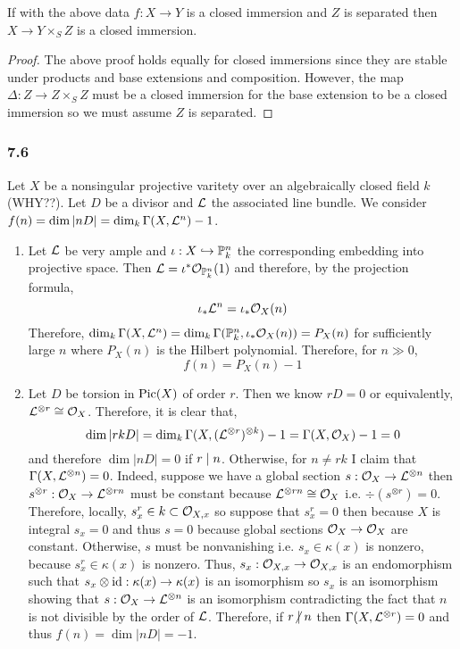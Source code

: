 \documentclass[12pt]{article}
\begin{document}
\begin{corollary}
If with the above data $f : X \to Y$ is a closed immersion and $Z$ is separated then $X \to Y \times_S Z$ is a closed immersion.
\end{corollary}

\begin{proof}
The above proof holds equally for closed immersions since they are stable under products and base extensions and composition. However, the map $\Delta : Z \to Z \times_S Z$ must be a closed immersion for the base extension to be a closed immersion so we must assume $Z$ is separated. 
\end{proof}

\subsubsection{7.6}

Let $X$ be a nonsingular projective varitety over an algebraically closed field $k$ (WHY??). Let $D$ be a divisor and $\mathcal{L}$ the associated line bundle. We consider $f(n) = \dim |n D| = \dim_k \Gamma(X, \mathcal{L}^n) - 1$.

\begin{enumerate}
\item Let $\mathcal{L}$ be very ample and $\iota : X \hookrightarrow \mathbb{P}^n_k$ the corresponding embedding into projective space. Then $\mathcal{L} = \iota^* \mathcal{O}_{\mathbb{P}^n_k}(1)$ and therefore, by the projection formula,
\[ \iota_* \mathcal{L}^n = \iota_* \mathcal{O}_{X}(n) \]
Therefore, $\dim_k \Gamma(X, \mathcal{L}^n) = \dim_k \Gamma(\mathbb{P}^n_k, \iota_* \mathcal{O}_{X}(n)) = P_X(n)$ for sufficiently large $n$ where $P_X(n)$ is the Hilbert polynomial. Therefore, for $n \gg 0$,
\[ f(n) = P_X(n) - 1 \]

\item Let $D$ be torsion in $\mathrm{Pic}(X)$ of order $r$. Then we know $r D = 0$ or equivalently, $\mathcal{L}^{\otimes r} \cong \mathcal{O}_{X}$. Therefore, it is clear that,
\[ \dim |rkD| = \dim_k \Gamma(X, (\mathcal{L}^{\otimes r})^{\otimes k}) - 1 = \Gamma(X, \mathcal{O}_{X}) - 1 = 0 \]
and therefore $\dim |n D| = 0$ if $r \mid n$. Otherwise, for $n \neq rk$ I claim that $\Gamma(X, \mathcal{L}^{\otimes n}) = 0$. Indeed, suppose we have a global section $s : \mathcal{O}_{X} \to \mathcal{L}^{\otimes n}$ then $s^{\otimes r} : \mathcal{O}_{X} \to \mathcal{L}^{\otimes rn}$ must be constant because $\mathcal{L}^{\otimes rn} \cong \mathcal{O}_{X}$ i.e. $\div{(s^{\otimes r})} = 0$. Therefore, locally, $s^r_x \in k \subset \mathcal{O}_{X, x}$ so suppose that $s^r_x = 0$ then because $X$ is integral $s_x = 0$ and thus $s = 0$ because global sections $\mathcal{O}_{X} \to \mathcal{O}_{X}$ are constant. Otherwise, $s$ must be nonvanishing i.e. $s_x \in \kappa(x)$ is nonzero, because $s^r_x \in \kappa(x)$ is nonzero. Thus, $s_x : \mathcal{O}_{X, x} \to \mathcal{O}_{X, x}$ is an endomorphism such that $s_x \otimes \mathrm{id} : \kappa(x) \to \kappa(x)$ is an isomorphism so $s_x$ is an isomorphism showing that $s : \mathcal{O}_{X} \to \mathcal{L}^{\otimes n}$ is an isomorphism contradicting the fact that $n$ is not divisible by the order of $\mathcal{L}$. Therefore, if $r \ndivides n$ then $\Gamma(X, \mathcal{L}^{\otimes r}) = 0$ and thus $f(n) = \dim{|nD|} = -1$. 
\end{enumerate}
\end{document}
